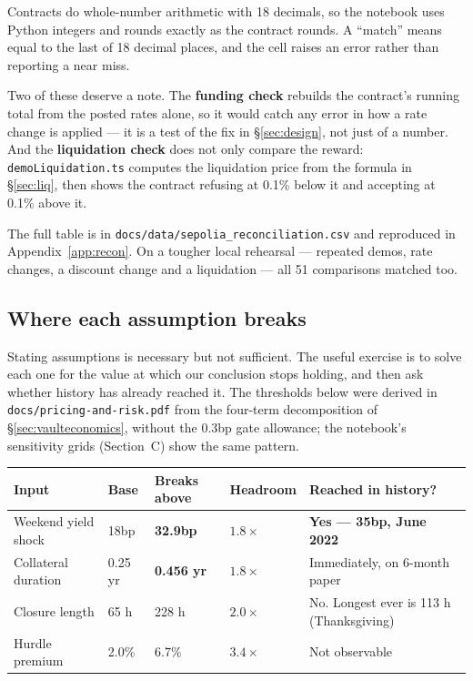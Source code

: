 \documentclass[11pt,a4paper]{article}
\begin{document}
Contracts do whole-number arithmetic with 18 decimals, so the notebook uses Python integers and
rounds exactly as the contract rounds. A ``match'' means equal to the last of 18 decimal places, and
the cell raises an error rather than reporting a near miss.

\begin{center}
\small
\reconCategoryTable
\end{center}

Two of these deserve a note. The \textbf{funding check} rebuilds the contract's running total from
the posted rates alone, so it would catch any error in how a rate change is applied — it is a test of
the fix in \S\ref{sec:design}, not just of a number. And the \textbf{liquidation check} does not only
compare the reward: \texttt{demoLiquidation.ts} computes the liquidation price from the formula in
\S\ref{sec:liq}, then shows the contract refusing at 0.1\% below it and accepting at 0.1\% above it.

The full table is in \texttt{docs/data/sepolia\_reconciliation.csv} and reproduced in
Appendix~\ref{app:recon}. On a tougher local rehearsal — repeated demos, rate changes, a discount
change and a liquidation — all 51 comparisons matched too.

\subsection{Where each assumption breaks}\label{sec:breaks}

Stating assumptions is necessary but not sufficient. The useful exercise is to solve each one for the
value at which our conclusion stops holding, and then ask whether history has already reached it.
The thresholds below were derived in \texttt{docs/pricing-and-risk.pdf} from the four-term
decomposition of \S\ref{sec:vaulteconomics}, without the 0.3bp gate allowance; the notebook's
sensitivity grids (Section~C) show the same pattern.

\begin{center}
\small
\begin{tabular}{@{}p{4.0cm}p{1.8cm}p{2.2cm}p{1.8cm}p{4.4cm}@{}}
\toprule
\textbf{Input} & \textbf{Base} & \textbf{Breaks above} & \textbf{Headroom} & \textbf{Reached in history?} \\
\midrule
Weekend yield shock & 18bp & \textbf{32.9bp} & $1.8\times$ & \textbf{Yes --- 35bp, June 2022} \\
Collateral duration & 0.25 yr & \textbf{0.456 yr} & $1.8\times$ & Immediately, on 6-month paper \\
Closure length & 65 h & 228 h & $2.0\times$ & No. Longest ever is 113 h (Thanksgiving) \\
Hurdle premium & 2.0\% & 6.7\% & $3.4\times$ & Not observable \\
\bottomrule
\end{tabular}
\end{center}
\end{document}
